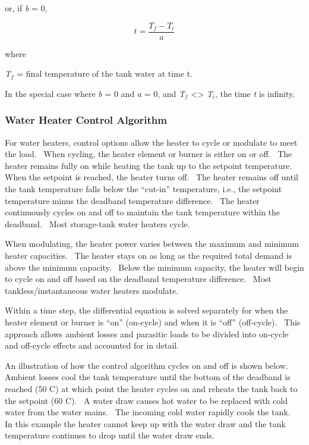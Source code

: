 or, if \emph{b} = 0,

\begin{equation}
t = \frac{{{T_f} - {T_i}}}{a}
\end{equation}

where

\emph{T\(_{f}\)} = final temperature of the tank water at time t.

In the special case where \emph{b} = 0 and \emph{a} = 0, and \emph{T\(_{f}\)} \textless{}\textgreater{} \emph{T\(_{i}\)}, the time \emph{t} is infinity.

\subsubsection{Water Heater Control Algorithm}\label{water-heater-control-algorithm}

For water heaters, control options allow the heater to cycle or modulate to meet the load.~ When cycling, the heater element or burner is either on or off.~ The heater remains fully on while heating the tank up to the setpoint temperature.~ When the setpoint is reached, the heater turns off.~ The heater remains off until the tank temperature falls below the ``cut-in'' temperature, i.e., the setpoint temperature minus the deadband temperature difference.~ The heater continuously cycles on and off to maintain the tank temperature within the deadband.~ Most storage-tank water heaters cycle.

When modulating, the heater power varies between the maximum and minimum heater capacities.~ The heater stays on as long as the required total demand is above the minimum capacity.~ Below the minimum capacity, the heater will begin to cycle on and off based on the deadband temperature difference.~ Most tankless/instantaneous water heaters modulate.

Within a time step, the differential equation is solved separately for when the heater element or burner is ``on'' (on-cycle) and when it is ``off'' (off-cycle).~ This approach allows ambient losses and parasitic loads to be divided into on-cycle and off-cycle effects and accounted for in detail.

An illustration of how the control algorithm cycles on and off is shown below.~ Ambient losses cool the tank temperature until the bottom of the deadband is reached (50 C) at which point the heater cycles on and reheats the tank back to the setpoint (60 C).~ A water draw causes hot water to be replaced with cold water from the water mains.~ The incoming cold water rapidly cools the tank.~ In this example the heater cannot keep up with the water draw and the tank temperature continues to drop until the water draw ends.

